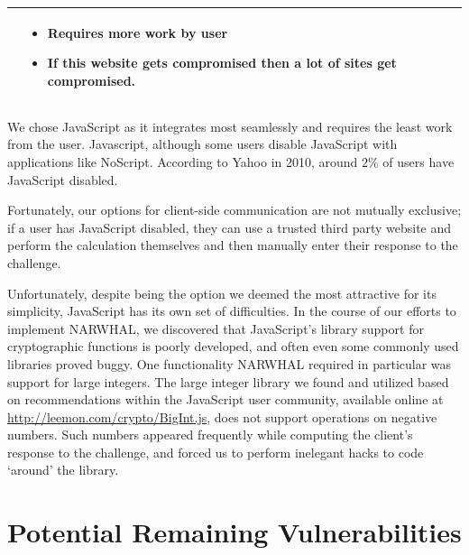 \documentclass[11pt]{article}
\begin{document}
\begin{center}
\begin{tabular}{|  p{6cm} | p{5cm} | p{5cm} |}
    &

    \begin{itemize}[leftmargin=*]
      \item Requires more work by user
      \item If this website gets compromised then a lot of sites get compromised.
    \end{itemize}
    
    \\ \hline
    
    \end{tabular}
\end{center}

\normalsize

We chose JavaScript as it integrates most seamlessly and requires the least work from the user. Javascript, although some users disable JavaScript with applications like NoScript. According to Yahoo in 2010, around $2\%$ of users have JavaScript disabled. \cite{Zakas}

Fortunately, our options for client-side communication are not mutually exclusive; if a user has JavaScript disabled, they can use a trusted third party website and perform the calculation themselves and then manually enter their response to the challenge.

Unfortunately, despite being the option we deemed the most attractive for its simplicity, JavaScript has its own set of difficulties.  In the course of our efforts to implement NARWHAL, we discovered that JavaScript’s library support for cryptographic functions is poorly developed, and often even some commonly used libraries proved buggy.  One functionality NARWHAL required in particular was support for large integers.  The large integer library we found and utilized based on recommendations within the JavaScript user community, available online at \url{http://leemon.com/crypto/BigInt.js}, does not support operations on negative numbers.  Such numbers appeared frequently while computing the client’s response to the challenge, and forced us to perform inelegant hacks to code ‘around’ the library.


\section{Potential Remaining Vulnerabilities}
\end{document}
